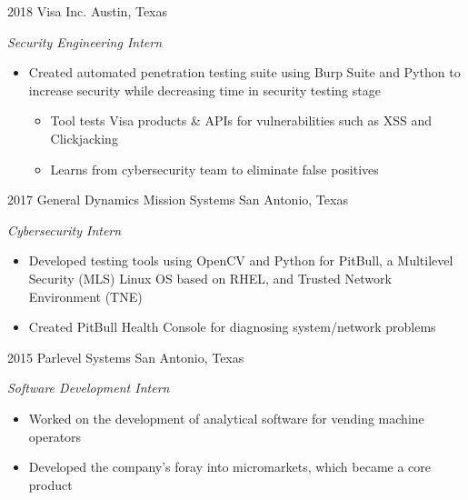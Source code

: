 \documentclass[]{friggeri-cv} %
\begin{document}
\begin{entrylist}
	\entry
	{2018}
	{Visa Inc.}
	{Austin, Texas}
	{\emph{Security Engineering Intern}
		\begin{itemize}
			\item Created automated penetration testing suite using Burp Suite and Python to increase security while decreasing time in security testing stage
			\begin{itemize}
				\item Tool tests Visa products \& APIs for vulnerabilities such as XSS and Clickjacking
				\item Learns from cybersecurity team to eliminate false positives
			\end{itemize}
		\end{itemize}
	}
\vspace{-5pt}
	

	\entry
	{2017}
	{General Dynamics Mission Systems}
	{San Antonio, Texas}
	{\emph{Cybersecurity Intern}
		\begin{itemize}
			\item Developed testing tools using OpenCV and Python for PitBull, a Multilevel Security (MLS) Linux OS based on RHEL, and Trusted Network Environment (TNE) 
			\item Created PitBull Health Console for diagnosing system/network problems
		\end{itemize}
	}
\vspace{-5pt}


	\entry
	{2015}
	{Parlevel Systems}
	{San Antonio, Texas}
	{\emph{Software Development Intern}
		\begin{itemize}
			\item Worked on the development of analytical software for vending machine operators
			\item Developed the company's foray into micromarkets, which became a core product
		\end{itemize}
	}
\vspace{-25pt}

\end{entrylist}

%

\end{document}
